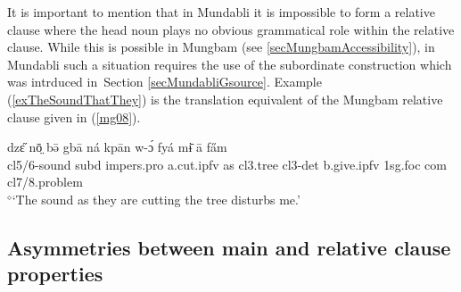 \documentclass[10pt,twoside]{article}
\newcommand{\gl}[1]{`#1'}
\def\VSP{\vspace{0pt}}
\newcommand{\cl}[1]{{\sc cl#1}}
\newcommand{\pref}[1]{(\ref{#1})}
\newcommand{\sref}[1]{Section \ref{#1}}
\def\elicited{$^\diamond$}
\newcommand{\comment}[1]{\textcolor{blue}{\emph{#1}}}
\begin{document}
%
%
%

It is important to mention that in Mundabli it is impossible to form a relative clause 
where the head noun plays no obvious grammatical role within the relative clause.
While this is possible in Mungbam (see \ref{secMungbamAccessibility}), in Mundabli such a situation requires the use of the 
subordinate construction which was intrduced in~\sref{secMundabliGsource}. 
Example \pref{exTheSoundThatThey} is the 
translation equivalent of the Mungbam relative clause given in \pref{mg08}.

\begin{exe}
	\ex \label{exTheSoundThatThey}	
		\gll 	dzɛ̋ nō̤ bə̄ gbā ná kpān w-ɔ́ fyá mɨ̄ ā fa̋m	\\
			\cl5/6-sound {\sc subd} {\sc impers.pro} a.cut.{\sc ipfv}  as \cl3.tree \cl3-{\sc det} b.give.{\sc ipfv} {\sc 1sg.foc} {\sc com} \cl7/8.problem	\\
		\glt \VSP \elicited \gl{The sound as they are cutting the tree disturbs me.}
\end{exe}%

\subsection{Asymmetries between main and relative clause properties}\label{secMundabliTenseAspectFocus}


%
\end{document}
